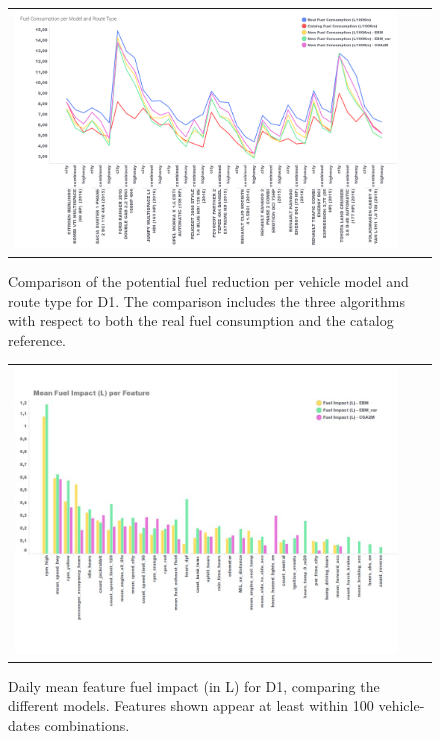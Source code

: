 \begin{figure}
  \centering
  \begin{tabular}{c@{\qquad}c@{\qquad}c}
  \includegraphics[width=420pt]{figures/chapter6_LucaFleet/FuelReductionPerModel.PNG}
  \end{tabular} 
  \caption{Comparison of the potential fuel reduction per vehicle model and route type for D1. The comparison includes the three algorithms with respect to both the real fuel consumption and the catalog reference.\label{fig:ch6-FuelReductionPerModel}}

  \begin{tabular}{c@{\qquad}c@{\qquad}c}
  \includegraphics[width=410pt]{figures/chapter6_LucaFleet/FuelImpactperFeature.jpg}
  \end{tabular} 
  \caption{Daily mean feature fuel impact (in L) for D1, comparing the different models. Features shown appear at least within 100 vehicle-dates combinations.\label{fig:ch6-FuelImpactperFeature}}
\end{figure}


